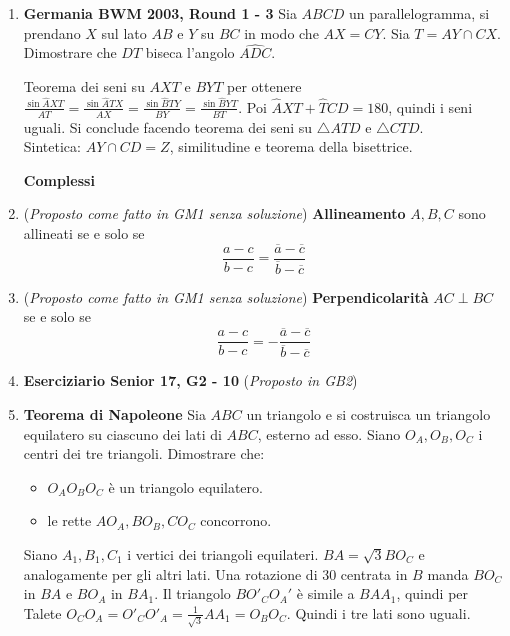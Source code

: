 \begin{enumerate}
\item \textbf{Germania BWM 2003, Round 1 - 3} Sia $ABCD$ un parallelogramma, si prendano $X$ sul lato $AB$ e $Y$ su $BC$ in modo che $AX=CY$. Sia $T=AY\cap CX$. Dimostrare che $DT$ biseca l'angolo $\widehat{ADC}$.\\
\begin{sol}
 Teorema dei seni su $AXT$ e $BYT$ per ottenere $\frac{\sin\widehat AXT}{AT}=\frac{\sin\widehat ATX}{AX}=\frac{\sin\widehat BTY}{BY}=\frac{\sin\widehat BYT}{BT}$.
 Poi $\widehat AXT+\widehat TCD=180$, quindi i seni uguali. Si conclude facendo teorema dei seni su $\triangle ATD$ e $\triangle CTD$.\\
 Sintetica: $AY\cap CD=Z$, similitudine e teorema della bisettrice.
\end{sol}





\textbf{Complessi}

\item (\emph{Proposto come fatto in GM1 senza soluzione}) \textbf{Allineamento} $A,B,C$ sono allineati se e solo se 
$$\frac{a-c}{b-c}=\frac{\overline{a}-\overline{c}}{\overline{b}-\overline{c}}$$

\item (\emph{Proposto come fatto in GM1 senza soluzione}) \textbf{Perpendicolarità} $AC\perp BC$ se e solo se 
$$\frac{a-c}{b-c}= - \frac{\overline{a}-\overline{c}}{\overline{b}-\overline{c}}$$


\item \textbf{Eserciziario Senior 17, G2 - 10} (\emph{Proposto in GB2})

\item \textbf{Teorema di Napoleone} Sia $ABC$ un triangolo e si costruisca un triangolo equilatero su ciascuno dei lati di $ABC$, esterno ad esso. Siano $O_A,O_B,O_C$ i centri dei tre triangoli. Dimostrare che:
\begin{itemize}
\item $O_AO_BO_C$ è un triangolo equilatero.
\item le rette $AO_A,BO_B,CO_C$ concorrono.
\end{itemize}


\begin{sol} Siano $A_1,B_1,C_1$ i vertici dei triangoli equilateri. $BA=\sqrt{3}BO_C$ e analogamente per gli altri lati. Una rotazione di 30 centrata in $B$ manda $BO_C$ in $BA$ e $BO_A$ in $BA_1$. Il triangolo $BO'_CO_A'$ è simile a $BAA_1$, quindi per Talete $O_CO_A=O'_CO'_A=\frac{1}{\sqrt{3}}AA_1=O_BO_C$. Quindi i tre lati sono uguali.


\end{sol}
\end{enumerate}
